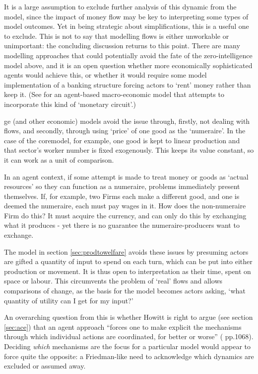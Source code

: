 {It is a large assumption to exclude further analysis of this dynamic from the model,  since the impact of money flow may be key to interpreting some types of model outcomes. Yet in being strategic about simplifications, this is a useful one to exclude. This is not to say that modelling flows is either unworkable or unimportant: the concluding discussion returns to this point. There are many modelling approaches that could potentially avoid the fate of the zero-intelligence model above, and it is an open question whether more economically sophisticated agents would achieve this, or whether it would require some model implementation of a banking structure forcing actors to `rent' money rather than keep it. (See \citealt{oeffner_agent-based_2008} for an agent-based macro-economic model that attempts to incorporate this kind of `monetary circuit'.)

\gls{ge} (and other economic) models avoid the issue through, firstly, not dealing with flows, and secondly, through using `price' of one good as the `numeraire'. In the case of the \gls{coremodel}, for example, one good is kept to linear production and that sector's worker number is fixed exogenously. This keeps its value constant, so it can work as a unit of comparison.

In an agent context, if some attempt is made to treat money or goods as `actual resources' so they can function as a numeraire, problems immediately present themselves. If, for example, two Firms each make a different good, and one is deemed the numeraire, each must pay wages in it. How does the non-numeraire Firm do this? It must acquire the currency, and can only do this by exchanging what it produces - yet there is no guarantee the numeraire-producers want to exchange. 

The model in section \ref{sec:prodtowelfare} avoids these issues by presuming actors are gifted a quantity of input to spend on each turn, which can be put into either production or movement. It is thus open to interpretation as their time, spent on space or labour. This circumvents the problem of `real' flows and allows comparisons of change, as the basis for the model becomes actors asking, `what quantity of utility can I get for my input?'

An overarching question from this is whether Howitt is right to argue (see section \ref{sec:ace}) that an agent approach ``forces one to make explicit the mechanisms through which individual actions are coordinated, for better or worse'' (\citealt{howitt_coordination_2006} pp.1068). Deciding \emph{which} mechanisms are the focus for a particular model would appear to force quite the opposite: a Friedman-like need to acknowledge which dynamics are excluded or assumed away.

}

